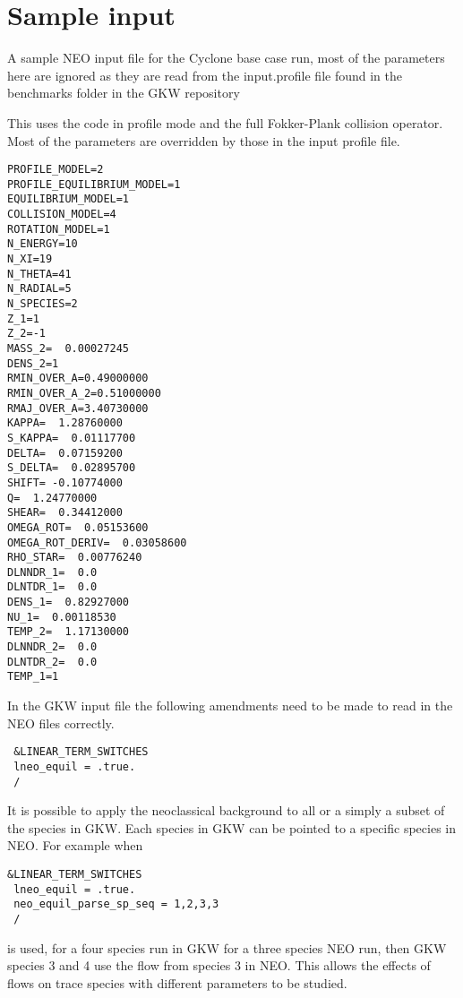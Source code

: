 \section{Sample input}

A sample NEO input file for the Cyclone base case run, most of the parameters here are ignored as they are read from the input.profile file found in the benchmarks folder in the GKW repository

This uses the code in profile mode and the full Fokker-Plank collision operator.  Most of the parameters are overridden by those in the input profile file.

\begin{verbatim}
PROFILE_MODEL=2
PROFILE_EQUILIBRIUM_MODEL=1
EQUILIBRIUM_MODEL=1
COLLISION_MODEL=4
ROTATION_MODEL=1
N_ENERGY=10
N_XI=19
N_THETA=41
N_RADIAL=5
N_SPECIES=2
Z_1=1
Z_2=-1
MASS_2=  0.00027245
DENS_2=1
RMIN_OVER_A=0.49000000
RMIN_OVER_A_2=0.51000000
RMAJ_OVER_A=3.40730000
KAPPA=  1.28760000
S_KAPPA=  0.01117700
DELTA=  0.07159200
S_DELTA=  0.02895700
SHIFT= -0.10774000
Q=  1.24770000
SHEAR=  0.34412000
OMEGA_ROT=  0.05153600
OMEGA_ROT_DERIV=  0.03058600
RHO_STAR=  0.00776240
DLNNDR_1=  0.0
DLNTDR_1=  0.0
DENS_1=  0.82927000
NU_1=  0.00118530
TEMP_2=  1.17130000
DLNNDR_2=  0.0
DLNTDR_2=  0.0
TEMP_1=1
\end{verbatim}

In the GKW input file the following amendments need to be made to read in the NEO files correctly.

\begin{verbatim}
 &LINEAR_TERM_SWITCHES
 lneo_equil = .true.
 /
 \end{verbatim}
 
 It is possible to apply the neoclassical background to all or a simply a subset of the species in GKW.  Each species in GKW can be pointed to a specific species in NEO.  For example when 

 \begin{verbatim}
&LINEAR_TERM_SWITCHES
 lneo_equil = .true.
 neo_equil_parse_sp_seq = 1,2,3,3
 /
 \end{verbatim} 
 
 is used, for a four species run in GKW for a three species NEO run, then GKW species 3 and 4 use the flow from species 3 in NEO.  This allows the effects of flows on trace species with different parameters to be studied.

